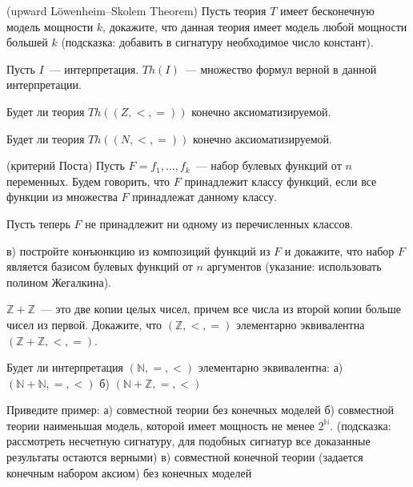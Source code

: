 \setcounter{curtask}{50}


\begin{task} (upward Löwenheim–Skolem Theorem)
    Пусть теория $T$ имеет бесконечную модель мощности $k$, докажите,
    что данная теория имеет модель любой мощности большей $k$
    (подсказка: добавить в сигнатуру необходимое число констант).
\end{task}

Пусть $I$~--- интерпретация. $Th(I)$~--- множество формул верной в
данной интерпретации.
\begin{task}
    Будет ли теория $Th((Z, <, =))$ конечно аксиоматизируемой.
\end{task}

\begin{task}
    Будет ли теория $Th((N, <, =))$ конечно аксиоматизируемой.
\end{task}


\breakline

\begin{ptask}{37} (критерий Поста)
	Пусть $F = {f_1, \dots, f_k}$~--- набор булевых функций от $n$
    переменных. Будем говорить, что $F$ принадлежит классу функций,
    если все функции из множества $F$ принадлежат данному классу.
    
    Пусть теперь $F$ не принадлежит ни одному из перечисленных
    классов.

    в) постройте конъюнкцию из композиций функций из $F$ и докажите,
    что набор $F$ является базисом булевых функций от $n$ аргументов
    (указание: использовать полином Жегалкина).

\end{ptask}

\begin{ptask}{45}
	$\mathbb{Z} + \mathbb{Z}$~--- это две копии целых чисел, причем
    все числа из второй копии больше чисел из первой. Докажите, что
    $(\mathbb{Z}, <, =)$ элементарно эквивалентна $(\mathbb{Z} +
    \mathbb{Z}, <, =)$.
\end{ptask}

\begin{ptask}{46}
    Будет ли интерпретация $(\mathbb{N}, =, <)$ элементарно
    эквивалентна:
    а) $(\mathbb{N} + \mathbb{N}, =, <)$
    б) $(\mathbb{N} + \mathbb{Z}, =, <)$
\end{ptask}

\begin{task}{48}
    Приведите пример:
    а) совместной теории без конечных моделей
    б) совместной теории наименьшая модель, которой имеет мощность не менее
    $2^{\mathbb{N}}$. (подсказка: рассмотреть несчетную сигнатуру,
    для подобных сигнатур все доказанные результаты остаются верными)
    в) совместной конечной теории (задается конечным набором аксиом) без конечных моделей
\end{task}